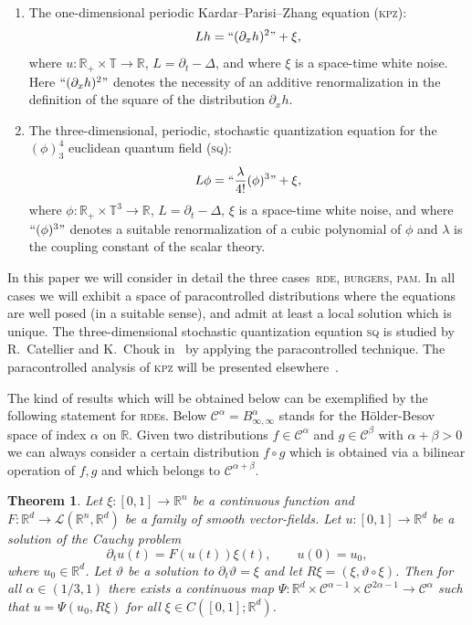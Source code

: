 \documentclass[11pt,a4paper]{article}
\newtheorem{theorem}{Theorem}
\theoremstyle{remark}
\newcommand{\R}{\mathbb{R}}
\newcommand{\CC}{\ensuremath{\mathscr{C}}}
\begin{document}
\begin{enumerate}
  \item The one-dimensional periodic Kardar--Parisi--Zhang equation (\textsc{kpz}):
  \[
   L h = ``(\partial_x h)^2" + \xi,
  \]
    where $u \colon \R_+ \times \mathbb{T} \rightarrow \R$, $L = \partial_t - \Delta$, and where $\xi$ is a space-time white noise. Here $``(\partial_x h)^2"$ denotes the necessity of an additive renormalization in the definition of the square of the distribution $\partial_x h$.

  \item The three-dimensional, periodic,  stochastic quantization equation for the $(\phi)^4_3$ euclidean quantum field (\textsc{sq}):
  \[
   L \phi = ``\frac{\lambda}{4!} (\phi)^3" + \xi,
  \]
    where $\phi \colon \R_+ \times \mathbb{T}^3 \rightarrow \R$, $L = \partial_t - \Delta$, $\xi$ is a space-time white noise, and where $``(\phi)^3"$ denotes a suitable renormalization of a cubic polynomial of $\phi$ and $\lambda$ is the coupling constant of the scalar theory.
  
\end{enumerate}

In this paper we will consider in detail the three cases~\textsc{rde}, \textsc{burgers}, \textsc{pam}. In all cases we will exhibit a space of paracontrolled distributions where the equations are well posed (in a suitable sense), and admit at least a local solution which is unique.
%
The three-dimensional stochastic quantization equation \textsc{sq} is studied by R.~Catellier and K.~Chouk in~\cite{Catellier2013} by applying the paracontrolled technique. The paracontrolled analysis of \textsc{kpz}  will be presented elsewhere~\cite{Gubinelli-KPZ-2013}.


\bigskip

The kind of results which will be obtained below can be exemplified by the following statement for \textsc{rde}s. Below $\CC^\alpha = B^\alpha_{\infty, \infty}$ stands for the H\"older-Besov space of index $\alpha$ on $\mathbb{R}$. Given two distributions $f\in \CC^\alpha$ and $g\in \CC^\beta$ with $\alpha+\beta >0$ we can always consider a certain distribution $f \circ g$ which is obtained via a bilinear operation of $f,g$ and which belongs to $\CC^{\alpha+\beta}$.
\begin{theorem}
Let $\xi:[0,1]\to \mathbb{R}^n$ be a continuous function and $F:\mathbb{R}^d\to \mathcal{L}(\mathbb{R}^n, \mathbb{R}^d)$ be a family of  smooth vector-fields. Let $u:[0,1]\to \mathbb{R}^d$ be a 
 solution of the Cauchy problem
\[
\partial_t u(t) = F(u(t)) \xi(t),\qquad
u(0)=u_0,
\]
where $u_0 \in \R^d$. Let $\vartheta$ be a solution to $\partial_t \vartheta = \xi$ and let $R\xi=(\xi,\vartheta\circ \xi)$. Then for all $\alpha \in (1/3,1)$ there exists a continuous map $\Psi:\mathbb{R}^d\times\CC^{\alpha-1}\times\CC^{2\alpha-1}\to \CC^{\alpha}$ such that $u=\Psi(u_0,R\xi)$ for all $\xi\in C([0,1];\mathbb{R}^d)$.
\end{theorem}
\end{document}

